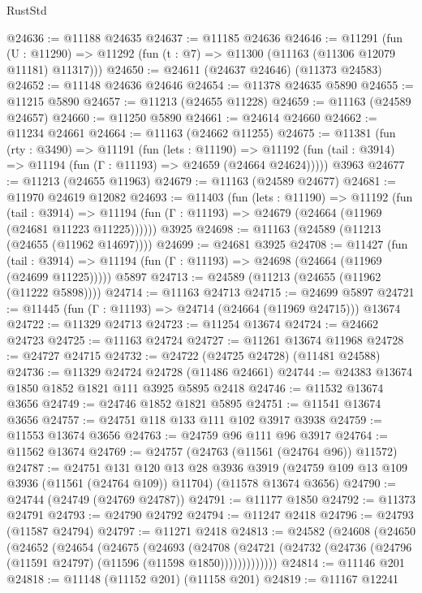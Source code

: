 \begin{lexlean}{RustStd}
\begin{coremodule}
@24636 := @11188 @24635
@24637 := @11185 @24636
@24646 := @11291
    (fun (U : @11290) => @11292 (fun (t : @7) => @11300 (@11163 (@11306 @12079 @11181) @11317)))
@24650 := @24611 (@24637 @24646) (@11373 @24583)
@24652 := @11148 @24636 @24646
@24654 := @11378 @24635 @5890
@24655 := @11215 @5890
@24657 := @11213 (@24655 @11228)
@24659 := @11163 (@24589 @24657)
@24660 := @11250 @5890
@24661 := @24614 @24660
@24662 := @11234 @24661
@24664 := @11163 (@24662 @11255)
@24675 := @11381
    (fun (rty : @3490) =>
    @11191
      (fun (lets : @11190) =>
      @11192 (fun (tail : @3914) => @11194 (fun (Γ : @11193) => @24659 (@24664 @24624)))))
    @3963
@24677 := @11213 (@24655 @11963)
@24679 := @11163 (@24589 @24677)
@24681 := @11970 @24619 @12082
@24693 := @11403
    (fun (lets : @11190) =>
    @11192
      (fun (tail : @3914) =>
      @11194 (fun (Γ : @11193) => @24679 (@24664 (@11969 (@24681 @11223 @11225))))))
    @3925
@24698 := @11163 (@24589 (@11213 (@24655 (@11962 @14697))))
@24699 := @24681 @3925
@24708 := @11427
    (fun (tail : @3914) => @11194 (fun (Γ : @11193) => @24698 (@24664 (@11969 (@24699 @11225)))))
    @5897
@24713 := @24589 (@11213 (@24655 (@11962 (@11222 @5898))))
@24714 := @11163 @24713
@24715 := @24699 @5897
@24721 := @11445 (fun (Γ : @11193) => @24714 (@24664 (@11969 @24715))) @13674
@24722 := @11329 @24713
@24723 := @11254 @13674
@24724 := @24662 @24723
@24725 := @11163 @24724
@24727 := @11261 @13674 @11968
@24728 := @24727 @24715
@24732 := @24722 (@24725 @24728) (@11481 @24588)
@24736 := @11329 @24724 @24728 (@11486 @24661)
@24744 := @24383 @13674 @1850 @1852 @1821 @111 @3925 @5895 @2418
@24746 := @11532 @13674 @3656
@24749 := @24746 @1852 @1821 @5895
@24751 := @11541 @13674 @3656
@24757 := @24751 @118 @133 @111 @102 @3917 @3938
@24759 := @11553 @13674 @3656
@24763 := @24759 @96 @111 @96 @3917
@24764 := @11562 @13674
@24769 := @24757 (@24763 (@11561 (@24764 @96)) @11572)
@24787 := @24751
    @131
    @120
    @13
    @28
    @3936
    @3919
    (@24759 @109 @13 @109 @3936 (@11561 (@24764 @109)) @11704)
    (@11578 @13674 @3656)
@24790 := @24744 (@24749 (@24769 @24787))
@24791 := @11177 @1850
@24792 := @11373 @24791
@24793 := @24790 @24792
@24794 := @11247 @2418
@24796 := @24793 (@11587 @24794)
@24797 := @11271 @2418
@24813 := @24582
    (@24608
      (@24650
        (@24652
          (@24654
            (@24675
              (@24693
                (@24708
                  (@24721 (@24732 (@24736 (@24796 (@11591 @24797) (@11596 (@11598 @1850)))))))))))))
@24814 := @11146 @201
@24818 := @11148 (@11152 @201) (@11158 @201)
@24819 := @11167 @12241

\end{coremodule}
\end{lexlean}

